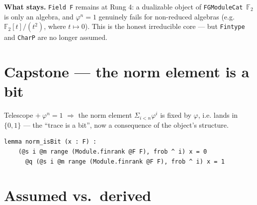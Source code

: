 \documentclass[11pt]{article}
\newcommand{\lc}[1]{\texttt{\small #1}}
\newcommand{\Ff}{\mathbb{F}_2}
\begin{document}
\begin{note}
\textbf{What stays.} \lc{Field F} remains at Rung 4: a dualizable object of
\lc{FGModuleCat}~$\Ff$ is only an algebra, and $\varphi^{n}=1$ genuinely fails for
non-reduced algebras (e.g. $\Ff[t]/(t^{2})$, where $t\mapsto0$). This is the honest
irreducible core --- but \lc{Fintype} and \lc{CharP} are no longer assumed.
\end{note}

\section{Capstone --- the norm element is a bit}

Telescope $+\ \varphi^{n}=1$ $\Rightarrow$ the norm element $\Sigma_{i<n}\varphi^{i}$
is fixed by $\varphi$, i.e. lands in $\{0,1\}$ --- the ``trace is a bit'', now a
consequence of the object's structure.

\begin{center}
\end{center}

\begin{lstlisting}
lemma norm_isBit (x : F) :
    (@s i @m range (Module.finrank @F F), frob ^ i) x = 0
      @q (@s i @m range (Module.finrank @F F), frob ^ i) x = 1
\end{lstlisting}

\section{Assumed vs.\ derived}
\end{document}

